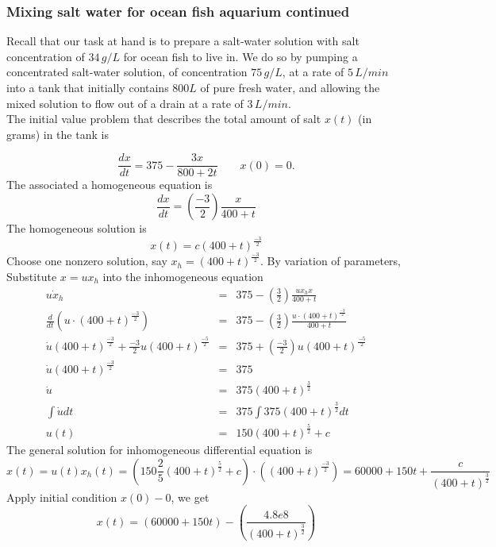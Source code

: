 \subsubsection{Mixing salt water for ocean fish aquarium continued}

Recall that our task at hand is to prepare a salt-water solution with salt concentration of $34\, g/L$ for ocean fish to live in.
We do so by pumping a concentrated salt-water solution, of concentration $75\, g/L$,
at a rate of $5\, L/min$ into a tank that initially contains $800L$ of pure fresh water,
and allowing the mixed solution to flow out of a drain at a rate of $3\, L/min$.\\

The initial value problem that describes the total amount of salt
$x(t)$ (in grams) in the tank is

\begin{equation*}
  \displaystyle \frac{dx}{dt} \displaystyle =
  \displaystyle  375-\frac{3x}{800+2t}\qquad x(0)=0.
\end{equation*}
The associated a homogeneous equation is
\begin{equation*}
  \frac{dx}{dt} = (\frac{-3}{2}) \frac{x}{400 + t} 
\end{equation*}
The homogeneous solution is
\begin{equation*}
  x(t) = c(400 + t)^{\frac{-3}{2}}
\end{equation*}
Choose one nonzero solution, say $x_h = (400+t)^{\frac{-3}{2}}$.
By variation of parameters,
Substitute $x = ux_h$ into the inhomogeneous equation
\begin{eqnarray*}
  \dot{ux_h} &=& 375 -(\frac{3}{2})\frac{ux_hx}{400+t} \\
  \frac{d}{dt} (u \cdot (400+t)^{\frac{-3}{2}})
             &=& 375 -(\frac{3}{2})\frac{u \cdot (400+t)^{\frac{-3}{2}}}{400+t} \\
  \dot{u} (400+t)^{\frac{-3}{2}} + \frac{-3}{2} u (400+t)^{\frac{-5}{2}}
             &=& 375 + (\frac{-3}{2}) u (400+t)^{\frac{-5}{2}} \\
  \dot{u} (400+t)^{\frac{-3}{2}} &=& 375 \\
  \dot{u} &=& 375 (400+t)^{\frac{3}{2}} \\
  \int \dot{u} dt &=& 375 \int 375 (400+t)^{\frac{3}{2}} dt \\
  u(t) &=& 150 (400+t)^{\frac{5}{2}} + c  
\end{eqnarray*}
The general solution for inhomogeneous differential equation is
\begin{equation*}
  x(t) = u(t)x_h(t) =  \left( 150 \frac{2}{5} (400+t)^{\frac{5}{2}} + c  \right) \cdot \left( (400+t)^{\frac{-3}{2}} \right)
  = 60000 + 150t + \frac{c}{(400+t)^{\frac{3}{2}}}
\end{equation*}
Apply initial condition $x(0) - 0$, we get
\begin{equation*}
  x(t) = \left( 60000 + 150t \right) - \left( \frac{4.8e8}{(400+t)^{\frac{3}{2}}} \right)
\end{equation*}

